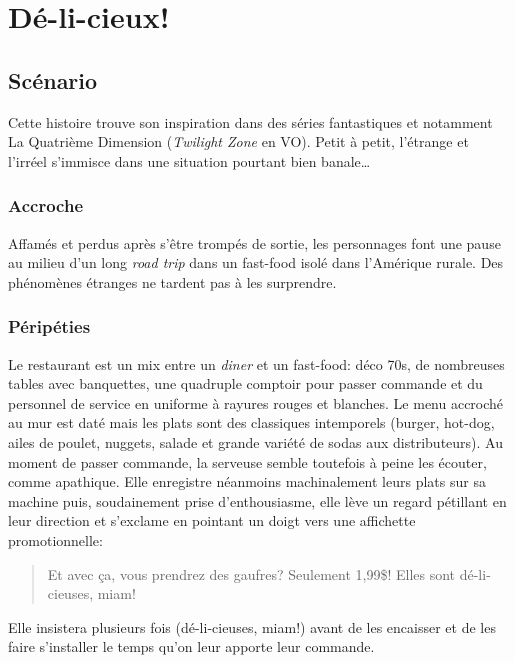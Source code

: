 \chapter{Dé-li-cieux!}

\section{Scénario}

Cette histoire trouve son inspiration dans des séries fantastiques et notamment La Quatrième Dimension (\emph{Twilight Zone} en VO).
Petit à petit, l'étrange et l'irréel s'immisce dans une situation pourtant bien banale\dots

\subsection{Accroche}

Affamés et perdus après s'être trompés de sortie, les personnages font une pause au milieu d'un long \emph{road trip} dans un fast-food isolé dans l'Amérique rurale. Des phénomènes étranges ne tardent pas à les surprendre.

\subsection{Péripéties}

Le restaurant est un mix entre un \emph{diner} et un fast-food: déco 70s, de nombreuses tables avec banquettes, une quadruple comptoir pour passer commande et du personnel de service en uniforme à rayures rouges et blanches.
Le menu accroché au mur est daté mais les plats sont des classiques intemporels (burger, hot-dog, ailes de poulet, nuggets, salade et grande variété de sodas aux distributeurs).
Au moment de passer commande, la serveuse semble toutefois à peine les écouter, comme apathique.
Elle enregistre néanmoins machinalement leurs plats sur sa machine puis, soudainement prise d'enthousiasme, elle lève un regard pétillant en leur direction et s'exclame en pointant un doigt vers une affichette promotionnelle:

\blockquote{Et avec ça, vous prendrez des gaufres? Seulement 1,99\$! Elles sont dé-li-cieuses, miam!}

Elle insistera plusieurs fois (dé-li-cieuses, miam!) avant de les encaisser et de les faire s'installer le temps qu'on leur apporte leur commande.

